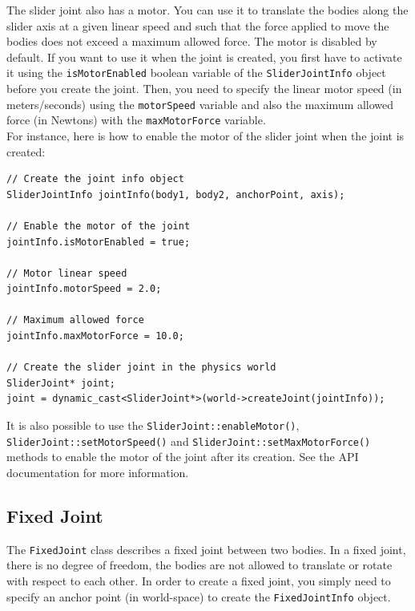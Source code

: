 \documentclass[a4paper,12pt]{article}
\begin{document}
     The slider joint also has a motor. You can use it to translate the bodies along the slider axis at a given linear speed and such that the force applied to
     move the bodies does not exceed a maximum allowed force. The motor is disabled by default. If you want to use it when the joint is created, you first have to activate it using the
     \texttt{isMotorEnabled} boolean variable of the \texttt{SliderJointInfo} object before you create the joint. Then, you need to specify the linear motor speed (in meters/seconds)
     using the \texttt{motorSpeed} variable and also the maximum allowed force (in Newtons) with the \texttt{maxMotorForce} variable. \\

     For instance, here is how to enable the motor of the slider joint when the joint is created: \\

     \begin{lstlisting}
// Create the joint info object
SliderJointInfo jointInfo(body1, body2, anchorPoint, axis);

// Enable the motor of the joint
jointInfo.isMotorEnabled = true;

// Motor linear speed
jointInfo.motorSpeed = 2.0;

// Maximum allowed force
jointInfo.maxMotorForce = 10.0;

// Create the slider joint in the physics world
SliderJoint* joint;
joint = dynamic_cast<SliderJoint*>(world->createJoint(jointInfo));
  \end{lstlisting}

     \vspace{0.6cm}

     \begin{sloppypar}
        It is also possible to use the \texttt{SliderJoint::enableMotor()}, \texttt{SliderJoint::setMotorSpeed()} and \texttt{SliderJoint::setMaxMotorForce()} methods to enable the
        motor of the joint after its creation. See the API documentation for more information.
     \end{sloppypar}

    \subsection{Fixed Joint}

    The \texttt{FixedJoint} class describes a fixed joint between two bodies. In a fixed joint, there is no degree of freedom, the bodies are not allowed to translate
    or rotate with respect to each other. In order to create a fixed joint, you simply need to specify an anchor point (in world-space) to create the \texttt{FixedJointInfo}
    object. \\
\end{document}
